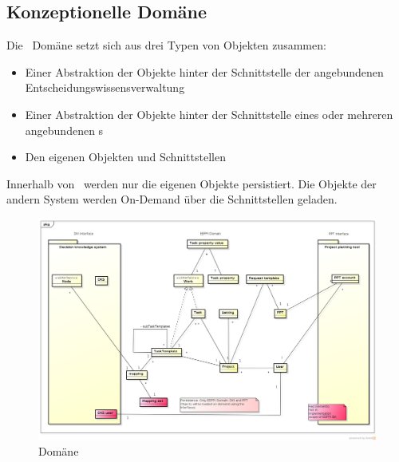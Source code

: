 	
		\subsection{Konzeptionelle Domäne}
			Die \eeppi\ Domäne setzt sich aus drei Typen von Objekten zusammen: 
			\begin{itemize}
				\item Einer Abstraktion der Objekte hinter der Schnittstelle der angebundenen Entscheidungswissensverwaltung
				\item Einer Abstraktion der Objekte hinter der Schnittstelle eines oder mehreren angebundenen \ppt s
				\item Den eigenen Objekten und Schnittstellen
			\end{itemize}
			
			Innerhalb von \eeppi\ werden nur die eigenen Objekte persistiert.
			Die Objekte der andern System werden On-Demand über die Schnittstellen geladen.
		
			\begin{landscape}
				\begin{figure}[H]
					\includegraphics[width=0.9\linewidth]{architecture/media/img/domain.png}
					\centering
					\caption{\eeppi Domäne}
					\label{fig:domain}
				\end{figure}				
			\end{landscape}
			
